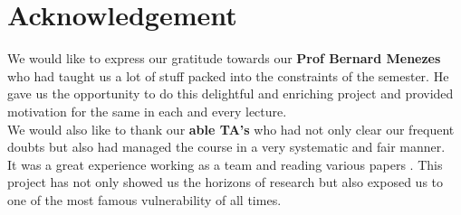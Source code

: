 \documentclass[12pt]{article}
\begin{document}
\section{Acknowledgement}
We would like to express our gratitude towards our \textbf{Prof Bernard Menezes} who had taught us a lot of stuff packed into the constraints of the semester. He gave us the opportunity to do this delightful and enriching project and provided motivation for the same in each and every lecture.\\

We would also like to thank our \textbf{able TA's} who had not only clear our frequent doubts but also had managed the course in a very systematic and fair manner.\\

It was a great experience working as a team and reading various papers . This project has not only showed us the horizons of research but also exposed us to one of the most famous vulnerability of all times.
  
\end{document}

